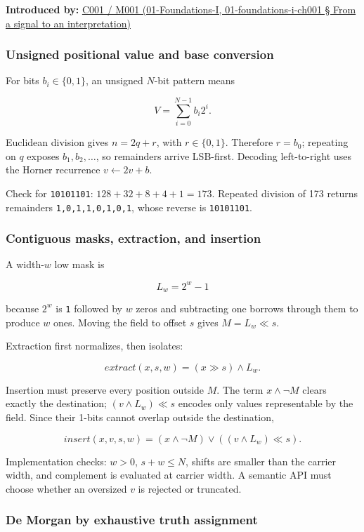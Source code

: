 \textbf{Introduced by:} \href{}{C001 / M001 (01-Foundations-I, 01-foundations-i-ch001 § From a signal to an interpretation)}

\subsubsection{Unsigned positional value and base conversion}\label{unsigned-positional-value-and-base-conversion}

For bits \(b_i\in\{0,1\}\), an unsigned \(N\)-bit pattern means

\[
V=\sum_{i=0}^{N-1}b_i2^i.
\]

Euclidean division gives \(n=2q+r\), with \(r\in\{0,1\}\). Therefore \(r=b_0\); repeating on \(q\) exposes \(b_1,b_2,\ldots\), so remainders arrive LSB-first. Decoding left-to-right uses the Horner recurrence \(v\leftarrow2v+b\).

Check for \texttt{10101101}: \(128+32+8+4+1=173\). Repeated division of 173 returns remainders \texttt{1,0,1,1,0,1,0,1}, whose reverse is \texttt{10101101}.

\subsubsection{Contiguous masks, extraction, and insertion}\label{contiguous-masks-extraction-and-insertion}

A width-\(w\) low mask is

\[
L_w=2^w-1
\]

because \(2^w\) is \texttt{1} followed by \(w\) zeros and subtracting one borrows through them to produce \(w\) ones. Moving the field to offset \(s\) gives \(M=L_w\ll s\).

Extraction first normalizes, then isolates:

\[
extract(x,s,w)=(x\gg s)\land L_w.
\]

Insertion must preserve every position outside \(M\). The term \(x\land\neg M\) clears exactly the destination; \((v\land L_w)\ll s\) encodes only values representable by the field. Since their 1-bits cannot overlap outside the destination,

\[
insert(x,v,s,w)=(x\land\neg M)\lor((v\land L_w)\ll s).
\]

Implementation checks: \(w>0\), \(s+w\le N\), shifts are smaller than the carrier width, and complement is evaluated at carrier width. A semantic API must choose whether an oversized \(v\) is rejected or truncated.

\subsubsection{De Morgan by exhaustive truth assignment}\label{de-morgan-by-exhaustive-truth-assignment}

